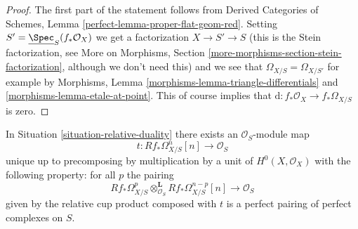 \begin{proof}
The first part of the statement follows from
Derived Categories of Schemes, Lemma \ref{perfect-lemma-proper-flat-geom-red}.
Setting $S' = \underline{\Spec}_S(f_*\mathcal{O}_X)$ we get a factorization
$X \to S' \to S$ (this is the Stein factorization, see
More on Morphisms, Section \ref{more-morphisms-section-stein-factorization},
although we don't need this)
and we see that $\Omega_{X/S} = \Omega_{X/S'}$ for example by
Morphisms, Lemma \ref{morphisms-lemma-triangle-differentials} and
\ref{morphisms-lemma-etale-at-point}. This of course implies that
$\text{d} : f_*\mathcal{O}_X \to f_*\Omega_{X/S}$ is zero.
\end{proof}

\begin{lemma}
\label{lemma-relative-duality-hodge}
In Situation \ref{situation-relative-duality} there exists an
$\mathcal{O}_S$-module map
$$
t : Rf_*\Omega^n_{X/S}[n] \longrightarrow \mathcal{O}_S
$$
unique up to precomposing by multiplication by a unit of
$H^0(X, \mathcal{O}_X)$ with the following property: for all $p$ the pairing
$$
Rf_*\Omega^p_{X/S}
\otimes_{\mathcal{O}_S}^\mathbf{L}
Rf_*\Omega^{n - p}_{X/S}[n]
\longrightarrow
\mathcal{O}_S
$$
given by the relative cup product composed with $t$
is a perfect pairing of perfect complexes on $S$.
\end{lemma}

